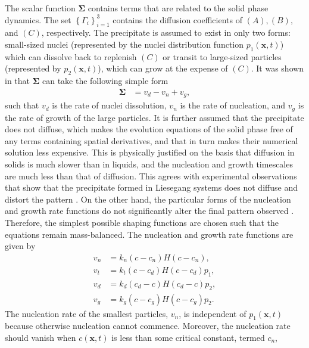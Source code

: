 \documentclass[aps,preprint]{revtex4}
\begin{document}
The scalar function $\mathbf{\Sigma}$ contains terms that are related to the
solid phase dynamics. The set $\left\{ \Gamma_{i} \right\} _{i=1}^{3}$
contains the diffusion coefficients of $(A),(B),$ and $(C)$, respectively. The
precipitate is assumed to exist in only two forms: small-sized nuclei
(represented by the nuclei distribution function $p_{1}(\mathbf{x},t)$) which
can dissolve back to replenish $(C)$ or transit to large-sized particles
(represented by $p_{2}(\mathbf{x},t)$), which can grow at the expense of
$(C)$. It was shown in \cite{precipitation} that $\mathbf{\Sigma}$ can take
the following simple form
\begin{align}
\mathbf{\Sigma}  & = v_{d} - v_{n} + v_{g},
\end{align}
such that $v_{d}$ is the rate of nuclei dissolution, $v_{n}$ is the rate of
nucleation, and $v_{g}$ is the rate of growth of the large particles. It is
further assumed that the precipitate does not diffuse, which makes the
evolution equations of the solid phase free of any terms containing spatial
derivatives, and that in turn makes their numerical solution less expensive.
This is physically justified on the basis that diffusion in solids is much
slower than in liquids, and the nucleation and growth timescales are much less
than that of diffusion. This agrees with experimental observations that show
that the precipitate formed in Liesegang systems does not diffuse and distort the
pattern \cite{Muller2,Muller3}. On the other hand, the particular forms of the
nucleation and growth rate functions do not significantly alter the final
pattern observed \cite{Muller-Poly,Heureux}. Therefore, the simplest possible
shaping functions are chosen such that the equations remain mass-balanced. The
nucleation and growth rate functions are given by
\begin{align}
v_{n} &  = k_{n}\left(  c-c_{n}\right)  H\left( c-c_{n}\right)  ,\\
v_{t} &  = k_{t}\left(  c-c_{d}\right)  H\left( c-c_{d}\right)  p_{1} ,\\
v_{d} &  = k_{d}\left(  c_{d} - c\right)  H\left( c_{d} - c\right)  p_{2},\\
v_{g} &  = k_{g} \left(  c - c_{g}\right)  H\left( c - c_{g}\right)  p_{2}.
\end{align}
The nucleation rate of the smallest particles, $v_{n}$, is independent of
$p_{1} \left(  \mathbf{x},t\right)  $ because otherwise nucleation cannot
commence. Moreover, the nucleation rate should vanish when $c\left(
\mathbf{x},t\right)  $ is less than some critical constant, termed $c_{n}$,
\end{document}
